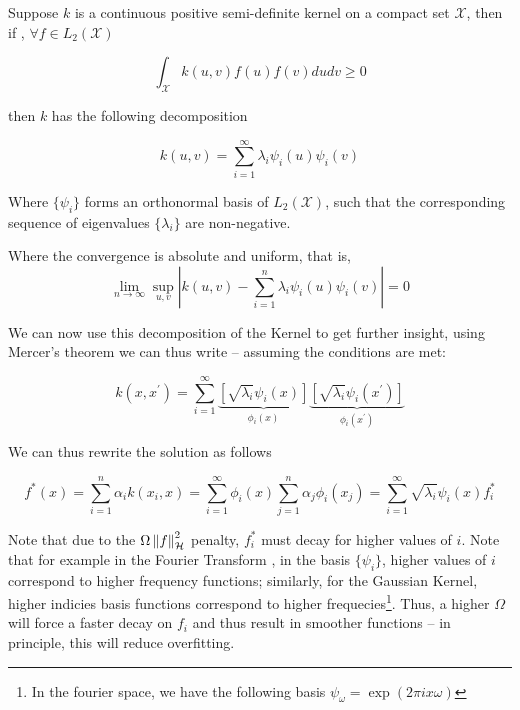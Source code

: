 \begin{theorem}[Mercer's] 

Suppose $k$ is a continuous positive semi-definite kernel on a compact set $\mathcal{X}$, then if
, $\forall f \in L_{2}(\mathcal{X})$

\[
\int_{\mathcal{X}} k(u, v) f(u) f(v) d u d v \geq 0
\]

then $k$ has the following decomposition

\begin{equation}
    k(u, v)=\sum_{i=1}^{\infty} \lambda_{i} \psi_{i}(u) \psi_{i}(v)
\end{equation}

Where $\{\psi_i\}$ forms an orthonormal basis of $L_2(\mathcal{X})$, 
such that the corresponding sequence of eigenvalues $\{\lambda_i\}$ are non-negative.

Where the convergence is absolute and uniform, that is,
\[
\lim _{n \rightarrow \infty} \sup _{u, v}\left|k(u, v)-\sum_{i=1}^{n} \lambda_{i} \psi_{i}(u) \psi_{i}(v)\right|=0
\]
    
\end{theorem}

We can now use this decomposition of the Kernel to get further insight, using Mercer's theorem we can 
thus write -- assuming the conditions are met:

$$
    k \left(x, x^{\prime}\right)=\sum_{i=1}^{\infty} 
    \underbrace{\left[\sqrt{\lambda_{i}} \psi_{i}(x)\right]}_{\phi_{i}(x)} 
    \underbrace{\left[\sqrt{\lambda_{i}} \psi_{i}\left(x^{\prime}\right)\right]}_{\phi_{i}\left(x^{\prime}\right)}
$$

We can thus rewrite the solution as follows

$$
    f^{*}(x) = \sum_{i=1}^{n} \alpha_{i} k\left(x_i, x\right) = 
    \sum_{i=1}^{\infty} \phi_i\left(x\right) 
    \sum_{j=1}^{n} \alpha_{j}  \phi_i\left(x_j\right) = 
    \sum_{i=1}^{\infty} \sqrt{\lambda_{i}} \psi_{i}(x) f^{*}_i 
$$

Note that due to the $\Omega \left\lVert f\right\rVert_{\mathcal{H}}^{2}$ penalty, $f^{*}_i$ must decay for higher values of $i$. Note that
for example in the Fourier Transform
, in the basis $\{\psi_i\}$, higher values of $i$ correspond to higher 
frequency functions; similarly, for the Gaussian Kernel, higher indicies basis functions correspond to 
higher frequecies\footnote{In the fourier space, we have the following
basis $\psi_\omega = \exp (2\pi i x \omega)$}. Thus, a higher $\Omega$ will force a faster decay on $f_i$ and thus result in smoother functions
-- in principle, this will reduce overfitting. 

